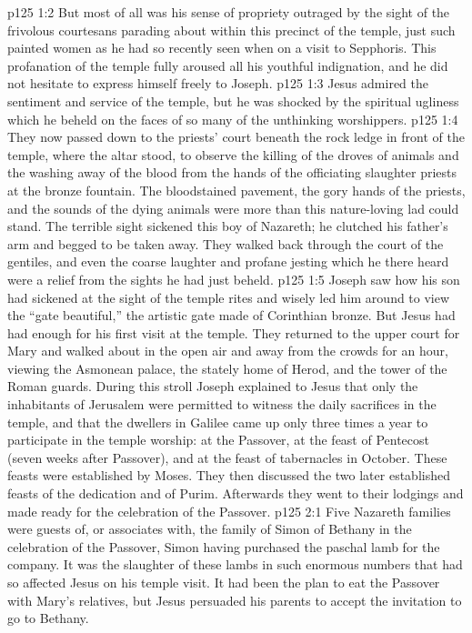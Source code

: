 \vs p125 1:2 But most of all was his sense of propriety outraged by the sight of the frivolous courtesans parading about within this precinct of the temple, just such painted women as he had so recently seen when on a visit to Sepphoris. This profanation of the temple fully aroused all his youthful indignation, and he did not hesitate to express himself freely to Joseph.
\vs p125 1:3 Jesus admired the sentiment and service of the temple, but he was shocked by the spiritual ugliness which he beheld on the faces of so many of the unthinking worshippers.
\vs p125 1:4 They now passed down to the priests’ court beneath the rock ledge in front of the temple, where the altar stood, to observe the killing of the droves of animals and the washing away of the blood from the hands of the officiating slaughter priests at the bronze fountain. The bloodstained pavement, the gory hands of the priests, and the sounds of the dying animals were more than this nature\hyp{}loving lad could stand. The terrible sight sickened this boy of Nazareth; he clutched his father’s arm and begged to be taken away. They walked back through the court of the gentiles, and even the coarse laughter and profane jesting which he there heard were a relief from the sights he had just beheld.
\vs p125 1:5 Joseph saw how his son had sickened at the sight of the temple rites and wisely led him around to view the “gate beautiful,” the artistic gate made of Corinthian bronze. But Jesus had had enough for his first visit at the temple. They returned to the upper court for Mary and walked about in the open air and away from the crowds for an hour, viewing the Asmonean palace, the stately home of Herod, and the tower of the Roman guards. During this stroll Joseph explained to Jesus that only the inhabitants of Jerusalem were permitted to witness the daily sacrifices in the temple, and that the dwellers in Galilee came up only three times a year to participate in the temple worship: at the Passover, at the feast of Pentecost (seven weeks after Passover), and at the feast of tabernacles in October. These feasts were established by Moses. They then discussed the two later established feasts of the dedication and of Purim. Afterwards they went to their lodgings and made ready for the celebration of the Passover.
\vs p125 2:1 Five Nazareth families were guests of, or associates with, the family of Simon of Bethany in the celebration of the Passover, Simon having purchased the paschal lamb for the company. It was the slaughter of these lambs in such enormous numbers that had so affected Jesus on his temple visit. It had been the plan to eat the Passover with Mary’s relatives, but Jesus persuaded his parents to accept the invitation to go to Bethany.
